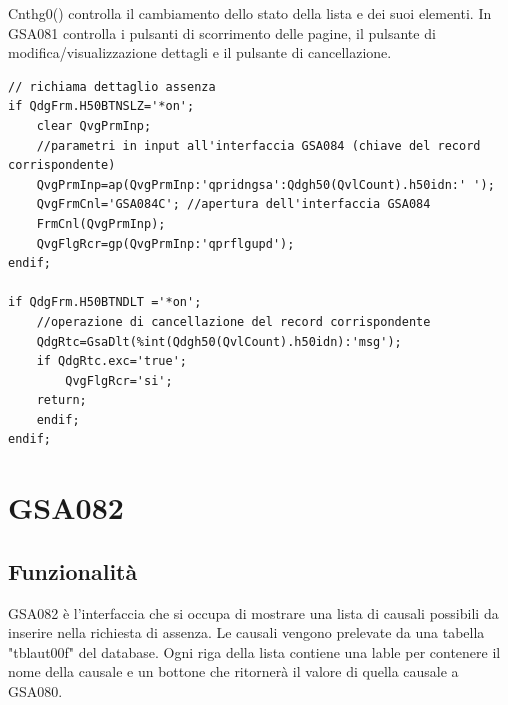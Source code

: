 \documentclass[target=bach,aauheader=,style=]{thud}
\begin{document}
Cnthg0() controlla il cambiamento dello stato della lista e dei suoi elementi.
In GSA081 controlla i pulsanti di scorrimento delle pagine, il pulsante di modifica/visualizzazione dettagli e il pulsante di cancellazione.
\begin{lstlisting}[language=RPG, caption=Codice RPG di controllo dei pulsanti]
// richiama dettaglio assenza
if QdgFrm.H50BTNSLZ='*on';
    clear QvgPrmInp;
    //parametri in input all'interfaccia GSA084 (chiave del record corrispondente)
    QvgPrmInp=ap(QvgPrmInp:'qpridngsa':Qdgh50(QvlCount).h50idn:' ');
    QvgFrmCnl='GSA084C'; //apertura dell'interfaccia GSA084
    FrmCnl(QvgPrmInp);
    QvgFlgRcr=gp(QvgPrmInp:'qprflgupd');
endif;

if QdgFrm.H50BTNDLT ='*on';
    //operazione di cancellazione del record corrispondente
    QdgRtc=GsaDlt(%int(Qdgh50(QvlCount).h50idn):'msg'); 
    if QdgRtc.exc='true';
        QvgFlgRcr='si';
    return;
    endif;
endif;
\end{lstlisting}
\break




\section{GSA082}

\subsection{Funzionalità}
GSA082 è l'interfaccia che si occupa di mostrare una lista di causali possibili da inserire nella richiesta di assenza.
Le causali vengono prelevate da una tabella "tblaut00f" del database.
Ogni riga della lista contiene una lable per contenere il nome della causale e un bottone che ritornerà il valore di quella causale a GSA080.
\end{document}
